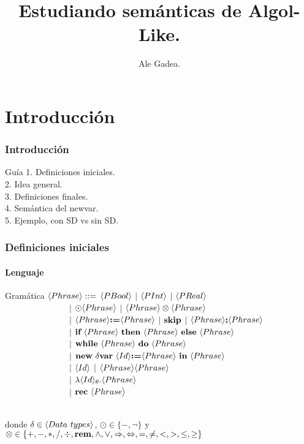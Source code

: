 \documentclass{beamer} %
\begin{document}
\title{Estudiando sem\'anticas de Algol-Like.}
\author{{Ale Gadea.}\\
\vspace*{0.5cm}}
\frame{\titlepage}

\section{Introducci\'on}

\begin{frame}
\frametitle{Introducci\'on}
\begin{block}{Gu\'ia}
1. Definiciones iniciales.\\
2. Idea general.\\
3. Definiciones finales.\\
4. Sem\'antica del newvar.\\
5. Ejemplo, con SD vs sin SD.
\end{block}
\end{frame}

\begin{frame}
\frametitle{Definiciones iniciales}
\framesubtitle{Lenguaje}

\begin{block}{Gram\'atica}
$\langle Phrase \rangle ::=$ $\langle PBool \rangle$ $|$ $\langle PInt \rangle$ $|$ $\langle PReal \rangle$ \\
\ \ \ \ \ \ \ \ \ \ \ \ \ \ \ $|$ 
$\odot \langle Phrase \rangle$ $|$ $\langle Phrase \rangle \otimes \langle Phrase \rangle $ \\ 
\ \ \ \ \ \ \ \ \ \ \ \ \ \ \ $|$ 
$\langle Phrase \rangle \textbf{:=} \langle Phrase \rangle$ $|$ $\textbf{skip}$ $|$ $\langle Phrase \rangle \textbf{;} \langle Phrase \rangle$ \\ 
\ \ \ \ \ \ \ \ \ \ \ \ \ \ \ $|$ 
$\textbf{if} \ \langle Phrase \rangle \ \textbf{then} \ \langle Phrase \rangle \ \textbf{else} \ \langle Phrase \rangle$ \\ 
\ \ \ \ \ \ \ \ \ \ \ \ \ \ \ $|$ 
$\textbf{while} \ \langle Phrase \rangle \ \textbf{do} \ \langle Phrase \rangle$ \\ 
\ \ \ \ \ \ \ \ \ \ \ \ \ \ \ $|$ 
$\textbf{new} \ \delta \textbf{var} \ \langle Id \rangle \textbf{:=} \langle Phrase \rangle \ \textbf{in} \ \langle Phrase \rangle$ \\ 
\ \ \ \ \ \ \ \ \ \ \ \ \ \ \ $|$ 
$\langle Id \rangle$ $|$ $\langle Phrase \rangle\langle Phrase \rangle$ \\
\ \ \ \ \ \ \ \ \ \ \ \ \ \ \ $|$ 
$\lambda \langle Id \rangle_{\theta} . \langle Phrase \rangle $ \\
\ \ \ \ \ \ \ \ \ \ \ \ \ \ \ $|$ 
$\textbf{rec} \ \langle Phrase \rangle$\\
\

donde $\delta \in \lrangles{Data \ types}$, $\odot \in \{-, \neg\}$ y 
$\otimes \in \{+,-,*,/,\div,\textbf{rem},\wedge,\vee,\Rightarrow,\Leftrightarrow, =,\neq,<,>,\leq,\geq\}$\\
\end{block}

\end{frame}
\end{document}
